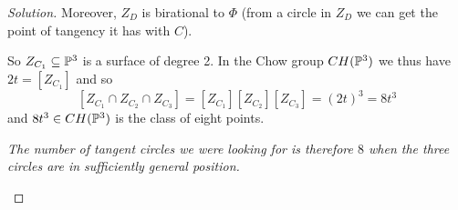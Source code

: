 \begin{proof}[Solution]
Moreover, $Z_D$ is birational to $\Phi$ (from a circle in $Z_D$ we can get the point of tangency it has with $C$).

So $Z_{C_1}\subseteq\mathbb{P}^3$ is a surface of degree 2. In the Chow group $CH(\mathbb{P}^3)$ we thus have $2t=[Z_{C_1}]$ and so
\[[Z_{C_1}\cap Z_{C_2}\cap Z_{C_3}]=[Z_{C_1}][Z_{C_2}][Z_{C_3}]=(2t)^3=8t^3\]
and $8t^3\in CH(\mathbb{P}^3)$ is the class of eight points.

\begin{center}
	\textit{The number of tangent circles we were looking for is therefore $8$ when the three circles are in sufficiently general position.}
\end{center}
\end{proof}
















